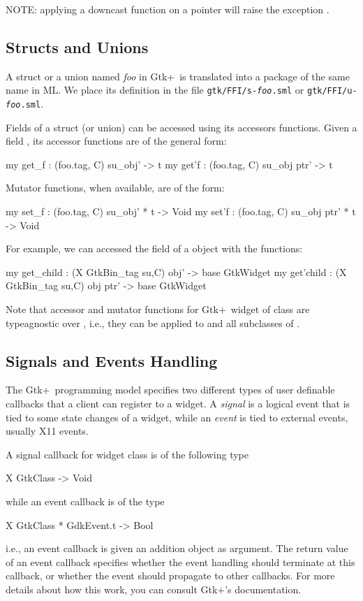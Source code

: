 \documentclass{article}
\newcommand{\gtk}{\mbox{\sf Gtk+}}
\begin{document}
   NOTE: applying a downcast function on a  pointer 
   will raise the exception .

\subsection{Structs and Unions}
      A struct or a union 
named {\em foo} in \gtk\ is translated into a package
of the same name in ML.   We place its definition in the
file {\tt gtk/FFI/s-{\em foo}.sml} or {\tt gtk/FFI/u-{\em foo}.sml}.

    Fields of a struct (or union) can be accessed using its
accessors functions.  Given a field , its accessor functions
are of the general form:
\begin{smldisp}
   my get_f : (foo.tag, C) su_obj' -> t
   my get'f : (foo.tag, C) su_obj ptr' -> t
\end{smldisp}

   Mutator functions, when available, are of the form:
\begin{smldisp}
   my set_f : (foo.tag, C) su_obj' * t -> Void
   my set'f : (foo.tag, C) su_obj ptr' * t -> Void
\end{smldisp}


For example, we can accessed the 
 field of a  object 
with the functions: 
\begin{smldisp}
   my get_child : (X GtkBin_tag su,C) obj' -> base GtkWidget 
   my get'child : (X GtkBin_tag su,C) obj ptr' -> base GtkWidget 
\end{smldisp}

Note that accessor and mutator functions for \gtk\ widget of class 
are typeagnostic over , i.e., 
they can be applied to  and all subclasses of 
. 

\subsection{Signals and Events Handling}

   The \gtk\ programming model specifies two different types of user
definable callbacks that a client can register to a widget.  
A {\em signal} is a logical event that is tied to some state 
changes of a widget, while
an {\em event} is tied to external events, usually X11 events.  

   A signal callback for widget class  is of the following type
\begin{smldisp}
   X GtkClass -> Void
\end{smldisp}
\noindent while an event callback is of the type
\begin{smldisp}
   X GtkClass * GdkEvent.t -> Bool
\end{smldisp}
\indent i.e., an event callback is given an addition  object as
argument.   The return value of an event callback specifies whether
the event handling should terminate at this callback, or whether
the event should propagate to other callbacks.  For more
details about how this work, you can consult \gtk's
documentation.
\end{document}
